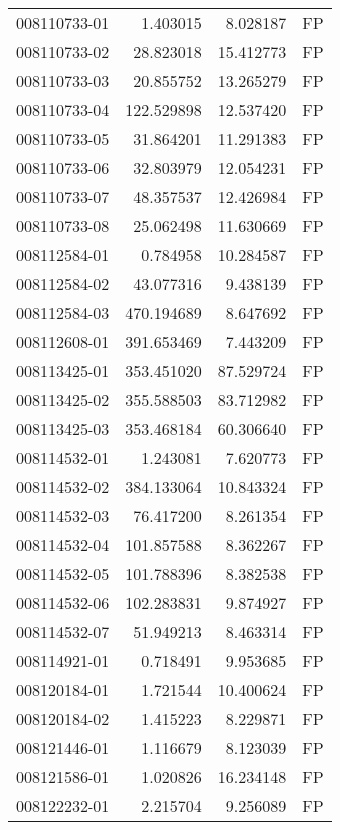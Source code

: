 \begin{tabular}{lrrl}
008110733-01 &    1.403015 &       8.028187 &   FP \\
008110733-02 &   28.823018 &      15.412773 &   FP \\
008110733-03 &   20.855752 &      13.265279 &   FP \\
008110733-04 &  122.529898 &      12.537420 &   FP \\
008110733-05 &   31.864201 &      11.291383 &   FP \\
008110733-06 &   32.803979 &      12.054231 &   FP \\
008110733-07 &   48.357537 &      12.426984 &   FP \\
008110733-08 &   25.062498 &      11.630669 &   FP \\
008112584-01 &    0.784958 &      10.284587 &   FP \\
008112584-02 &   43.077316 &       9.438139 &   FP \\
008112584-03 &  470.194689 &       8.647692 &   FP \\
008112608-01 &  391.653469 &       7.443209 &   FP \\
008113425-01 &  353.451020 &      87.529724 &   FP \\
008113425-02 &  355.588503 &      83.712982 &   FP \\
008113425-03 &  353.468184 &      60.306640 &   FP \\
008114532-01 &    1.243081 &       7.620773 &   FP \\
008114532-02 &  384.133064 &      10.843324 &   FP \\
008114532-03 &   76.417200 &       8.261354 &   FP \\
008114532-04 &  101.857588 &       8.362267 &   FP \\
008114532-05 &  101.788396 &       8.382538 &   FP \\
008114532-06 &  102.283831 &       9.874927 &   FP \\
008114532-07 &   51.949213 &       8.463314 &   FP \\
008114921-01 &    0.718491 &       9.953685 &   FP \\
008120184-01 &    1.721544 &      10.400624 &   FP \\
008120184-02 &    1.415223 &       8.229871 &   FP \\
008121446-01 &    1.116679 &       8.123039 &   FP \\
008121586-01 &    1.020826 &      16.234148 &   FP \\
008122232-01 &    2.215704 &       9.256089 &   FP \\

\end{tabular}
